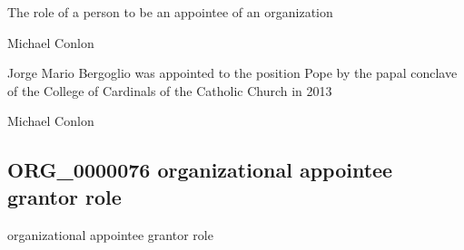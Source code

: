 \documentclass[letterpaper,10pt,english]{sphinxmanual}
\begin{document}
\begin{sphinxShadowBox}

\sphinxAtStartPar
{\hyperref[\detokenize{doc-BFO_0000023::doc}]{}}
\end{sphinxShadowBox}

\begin{sphinxShadowBox}

\sphinxAtStartPar
The role of a person to be an appointee of an organization
\end{sphinxShadowBox}

\begin{sphinxShadowBox}

\sphinxAtStartPar
Michael Conlon 
\end{sphinxShadowBox}

\begin{sphinxShadowBox}

\sphinxAtStartPar
Jorge Mario Bergoglio was appointed to the position Pope by the papal conclave of the College of Cardinals of the Catholic Church in 2013
\end{sphinxShadowBox}

\begin{sphinxShadowBox}

\sphinxAtStartPar
Michael Conlon 
\end{sphinxShadowBox}
\begin{quote}

\ignorespaces \end{quote}


\subsection{ORG\_0000076 \sphinxhyphen{} organizational appointee grantor role}
\label{\detokenize{doc-ORG_0000076:org-0000076-organizational-appointee-grantor-role}}\label{\detokenize{doc-ORG_0000076:index-0}}\label{\detokenize{doc-ORG_0000076::doc}}
\begin{sphinxShadowBox}

\sphinxAtStartPar
organizational appointee grantor role
\end{sphinxShadowBox}
\end{document}

